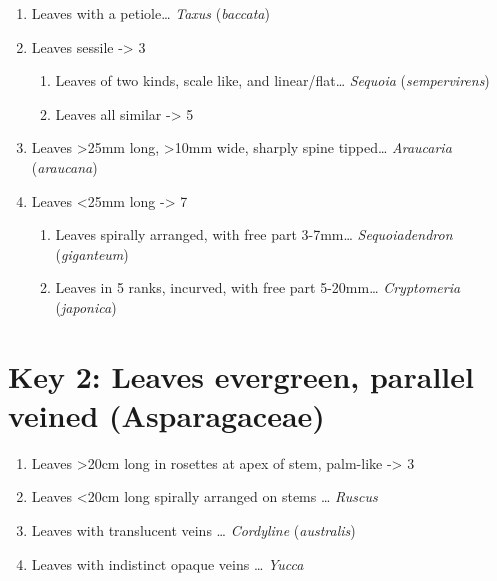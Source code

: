 \documentclass[openany]{book}
\providecommand{\tightlist}{%
  \setlength{\itemsep}{0pt}\setlength{\parskip}{0pt}}
\begin{document}
\begin{enumerate}
\def\labelenumi{\arabic{enumi}.}
\tightlist
\item
  Leaves with a petiole\ldots{} \emph{Taxus} (\emph{baccata})
\item
  Leaves sessile -\textgreater{} 3

  \begin{enumerate}
  \def\labelenumii{\arabic{enumii}.}
  \setcounter{enumii}{2}
  \tightlist
  \item
    Leaves of two kinds, scale like, and linear/flat\ldots{}
    \emph{Sequoia} (\emph{sempervirens})
  \item
    Leaves all similar -\textgreater{} 5
  \end{enumerate}
\item
  Leaves \textgreater{}25mm long, \textgreater{}10mm wide, sharply spine
  tipped\ldots{} \emph{Araucaria} (\emph{araucana})
\item
  Leaves \textless{}25mm long -\textgreater{} 7

  \begin{enumerate}
  \def\labelenumii{\arabic{enumii}.}
  \setcounter{enumii}{6}
  \tightlist
  \item
    Leaves spirally arranged, with free part 3-7mm\ldots{}
    \emph{Sequoiadendron} (\emph{giganteum})
  \item
    Leaves in 5 ranks, incurved, with free part 5-20mm\ldots{}
    \emph{Cryptomeria} (\emph{japonica})
  \end{enumerate}
\end{enumerate}

\hypertarget{key-2-leaves-evergreen-parallel-veined-asparagaceae}{%
\chapter{Key 2: Leaves evergreen, parallel veined
(Asparagaceae)}\label{key-2-leaves-evergreen-parallel-veined-asparagaceae}}

\begin{enumerate}
\def\labelenumi{\arabic{enumi}.}
\tightlist
\item
  Leaves \textgreater{}20cm long in rosettes at apex of stem, palm-like
  -\textgreater{} 3
\item
  Leaves \textless{}20cm long spirally arranged on stems \ldots{}
  \emph{Ruscus}
\item
  Leaves with translucent veins \ldots{} \emph{Cordyline}
  (\emph{australis})
\item
  Leaves with indistinct opaque veins \ldots{} \emph{Yucca}
\end{enumerate}
\end{document}
